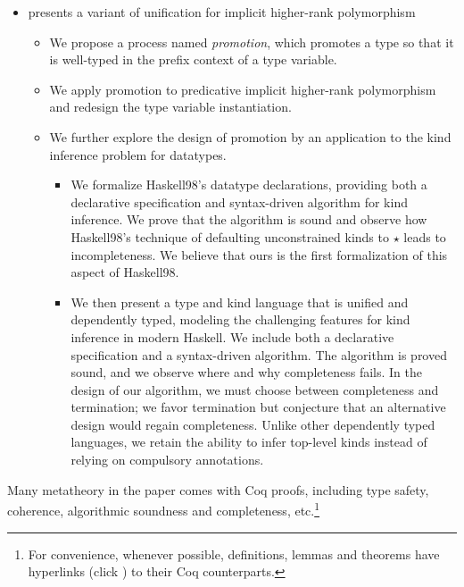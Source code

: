 \begin{itemize}
\item {} presents a variant of unification for implicit higher-rank polymorphism
  \begin{itemize}
  \item We propose a process named \textit{promotion}, which promotes a type so
    that it is well-typed in the prefix context of a type variable.
  \item We apply promotion to predicative implicit higher-rank polymorphism and
    redesign the type variable instantiation.
  \item We further explore the design of promotion by an application to the kind
  inference problem for datatypes.
  \begin{itemize}
  \item We formalize Haskell98’s datatype declarations, providing both a
    declarative specification and syntax-driven algorithm for kind inference. We
    prove that the algorithm is sound and observe how Haskell98’s technique of
    defaulting unconstrained kinds to $\star$ leads to incompleteness. We
    believe that ours is the first formalization of this aspect of Haskell98.
  \item We then present a type and kind language that is unified and dependently
    typed, modeling the challenging features for kind inference in modern
    Haskell. We include both a declarative specification and a syntax-driven
    algorithm. The algorithm is proved sound, and we observe where and why
    completeness fails. In the design of our algorithm, we must choose between
    completeness and termination; we favor termination but conjecture that an
    alternative design would regain completeness. Unlike other dependently typed
    languages, we retain the ability to infer top-level kinds instead of relying
    on compulsory annotations.
  \end{itemize}
  \end{itemize}
  
\end{itemize}

Many metatheory in the paper comes with Coq proofs, including type
safety, coherence, algorithmic soundness and completeness, etc.\footnote{For
  convenience, whenever possible, definitions, lemmas and theorems have hyperlinks (click
  \leftpointright) to their Coq counterparts. }

